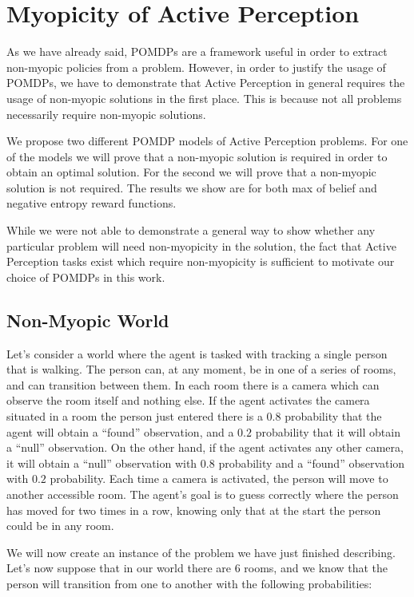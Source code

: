\section{Myopicity of Active Perception}

As we have already said, POMDPs are a framework useful in order to extract non-myopic policies from
a problem. However, in order to justify the usage of POMDPs, we have to demonstrate that Active
Perception in general requires the usage of non-myopic solutions in the first place. This is because
not all problems necessarily require non-myopic solutions.

We propose two different POMDP models of Active Perception problems. For one of the models we will
prove that a non-myopic solution is required in order to obtain an optimal solution. For the second
we will prove that a non-myopic solution is not required. The results we show are for both max of
belief and negative entropy reward functions.

While we were not able to demonstrate a general way to show whether any particular problem will need
non-myopicity in the solution, the fact that Active Perception tasks exist which require
non-myopicity is sufficient to motivate our choice of POMDPs in this work.

\subsection{Non-Myopic World}

Let's consider a world where the agent is tasked with tracking a single person that is walking. The
person can, at any moment, be in one of a series of rooms, and can transition between them. In each
room there is a camera which can observe the room itself and nothing else. If the agent activates
the camera situated in a room the person just entered there is a $0.8$ probability that the agent will
obtain a ``found'' observation, and a $0.2$ probability that it will obtain a ``null'' observation.
On the other hand, if the agent activates any other camera, it will obtain a ``null'' observation
with $0.8$ probability and a ``found'' observation with $0.2$ probability. Each time a camera is
activated, the person will move to another accessible room. The agent's goal is to guess correctly
where the person has moved for two times in a row, knowing only that at the start the person could
be in any room.

We will now create an instance of the problem we have just finished describing. Let's now suppose
that in our world there are 6 rooms, and we know that the person will transition from one to another
with the following probabilities:

